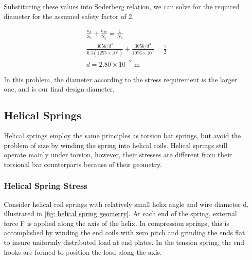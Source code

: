 \documentclass[a4paper,openany,nobib]{tufte-book}
\begin{document}
{{Substituting these values into Soderberg relation, we can solve for the
required diameter for the assumed safety factor of 2.

$$\begin{gathered}
    \frac{\sigma_a}{S_e} + \frac{\sigma_m}{S_y} = \frac{1}{N_s} \\
    \frac{3056/d^3}{0.3(1255 \times 10^6)} + \frac{3056/d^3}{1076 \times 10^6} = \frac{1}{2} \\
    d = 2.80 \times 10^{-2} \text{ m}
  \end{gathered}$$

In this problem, the diameter according to the stress requirement is the
larger one, and is our final design diameter.

\subsection{Helical Springs}
\label{helical-springs}
Helical springs employ the same principles as torsion bar springs, but
avoid the problem of size by winding the spring into helical coils.
Helical springs still operate mainly under torsion, however, their
stresses are different from their torsional bar counterparts because of
their geometry.

\subsubsection{Helical Spring Stress}
\label{helical-spring-stress}
Consider helical coil springs with relatively small helix angle and wire
diameter d, illustrated in
\ref{fig: helical spring geometry}. At
each end of the spring, external force F is applied along the axis of
the helix. In compression springs, this is accomplished by winding the
end coils with zero pitch and grinding the ends flat to insure uniformly
distributed load at end plates. In the tension spring, the end hooks are
formed to position the load along the axis.


}}
\end{document}
